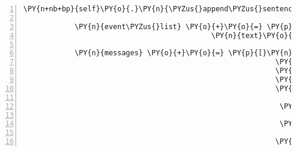 \begin{Verbatim}[commandchars=\\\{\},numbers=left,firstnumber=1,stepnumber=1]
            \PY{n+nb+bp}{self}\PY{o}{.}\PY{n}{\PYZus{}append\PYZus{}sentence}\PY{p}{(}\PY{n}{ID\PYZus{}CASSANDRA}\PY{p}{,} \PY{l+s}{\PYZsq{}}\PY{l+s}{Die Tür zum Gnomenweg ist offen! Aber da pass ich nicht durch.}\PY{l+s}{\PYZsq{}}\PY{p}{)}

            \PY{n}{event\PYZus{}list} \PY{o}{+}\PY{o}{=} \PY{p}{[}\PY{n}{fabula}\PY{o}{.}\PY{n}{SaysEvent}\PY{p}{(}\PY{n}{identifier}\PY{o}{=}\PY{n}{ID\PYZus{}CASSANDRA}\PY{p}{,}
                                            \PY{n}{text}\PY{o}{=}\PY{l+s}{\PYZsq{}}\PY{l+s}{Der Eingang zum Gnomenweg ist offen.}\PY{l+s}{\PYZsq{}}\PY{p}{)}\PY{p}{]}

            \PY{n}{messages} \PY{o}{+}\PY{o}{=} \PY{p}{[}\PY{n}{fabula}\PY{o}{.}\PY{n}{Message}\PY{p}{(}\PY{p}{[}\PY{n}{fabula}\PY{o}{.}\PY{n}{SpawnEvent}\PY{p}{(}\PY{n}{fabula}\PY{o}{.}\PY{n}{Entity}\PY{p}{(}\PY{l+s}{\PYZsq{}}\PY{l+s}{door\PYZus{}unlocked}\PY{l+s}{\PYZsq{}}\PY{p}{,}
                                                           \PY{n}{fabula}\PY{o}{.}\PY{n}{ITEM}\PY{p}{,}
                                                           \PY{n+nb+bp}{False}\PY{p}{,}
                                                           \PY{n+nb+bp}{False}\PY{p}{,}
                                                           \PY{p}{\PYZob{}}\PY{l+s}{\PYZsq{}}\PY{l+s}{image/png}\PY{l+s}{\PYZsq{}}\PY{p}{:} \PY{n}{fabula}\PY{o}{.}\PY{n}{Asset}\PY{p}{(}\PY{n}{uri}\PY{o}{=}\PY{l+s}{\PYZsq{}}\PY{l+s}{1x1\PYZhy{}empty.png}\PY{l+s}{\PYZsq{}}\PY{p}{,}
                                                                                      \PY{n}{data}\PY{o}{=}\PY{n+nb+bp}{None}\PY{p}{)}\PY{p}{,}
                                                            \PY{l+s}{\PYZsq{}}\PY{l+s}{audio/ogg}\PY{l+s}{\PYZsq{}}\PY{p}{:} \PY{n}{fabula}\PY{o}{.}\PY{n}{Asset}\PY{p}{(}\PY{n}{uri}\PY{o}{=}\PY{l+s}{\PYZsq{}}\PY{l+s}{door\PYZus{}unlocked.ogg}\PY{l+s}{\PYZsq{}}\PY{p}{,}
                                                                                      \PY{n}{data}\PY{o}{=}\PY{n+nb+bp}{None}\PY{p}{)}\PY{p}{,}
                                                            \PY{l+s}{\PYZsq{}}\PY{l+s}{text/plain}\PY{l+s}{\PYZsq{}}\PY{p}{:} \PY{n}{fabula}\PY{o}{.}\PY{n}{Asset}\PY{p}{(}\PY{n}{uri}\PY{o}{=}\PY{l+s}{\PYZsq{}}\PY{l+s}{door\PYZus{}unlocked.txt}\PY{l+s}{\PYZsq{}}\PY{p}{,}
                                                                                       \PY{n}{data}\PY{o}{=}\PY{n+nb+bp}{None}\PY{p}{)}\PY{p}{\PYZcb{}}\PY{p}{)}\PY{p}{,}
                                                           \PY{n}{room}\PY{o}{.}\PY{n}{entity\PYZus{}locations}\PY{p}{[}\PY{l+s}{\PYZsq{}}\PY{l+s}{door}\PY{l+s}{\PYZsq{}}\PY{p}{]} \PY{o}{+} \PY{p}{(}\PY{n}{room}\PY{o}{.}\PY{n}{identifier}\PY{p}{,}\PY{p}{)}\PY{p}{)}\PY{p}{]}\PY{p}{)}\PY{p}{,}

\end{Verbatim}
